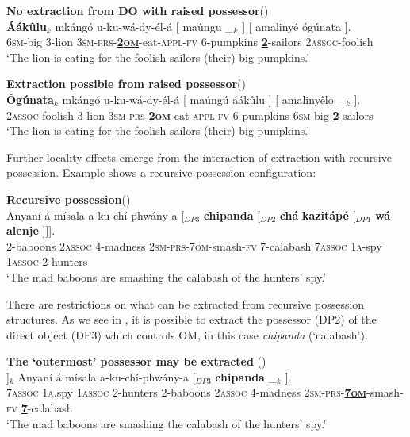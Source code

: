 \documentclass[output=paper,colorlinks,citecolor=brown]{langscibook}
\begin{document}
\ea%
    \label{ex:branan:12}
    \textbf{No extraction from DO with raised possessor}\hfill{(\citealt[55, ex. 22e]{Mchombo2004})}\\
    \gll    *\textbf{\'{A}ákûlu}$_{k}$ mkángó u-ku-wá-dy-él-á [ maûngu \_$_{k}$ ] [ amalinyé ógúnata ]. \\
            \hphantom{*}6\textsc{sm}-big 3-lion 3\textsc{sm-prs}-\textbf{\underline{2\textsc{om}}}-eat-\textsc{appl-fv} {} 6-pumpkins {} {} {} \textbf{\underline{2}}-sailors 2\textsc{assoc}-foolish {} \\
    \glt    `The lion is eating for the foolish sailors (their) big pumpkins.'
\z

\ea%
    \label{ex:branan:13}
    \textbf{Extraction possible from raised possessor}\hfill{(\citealt[56, ex. 22g]{Mchombo2004})}\\
    \gll    \textbf{\'{O}gúnata}$_{k}$ mkángó u-ku-wá-dy-él-á [ maúngú áákûlu ] [ amalinyêlo \_$_{k}$ ]. \\
            2\textsc{assoc}-foolish 3-lion 3\textsc{sm-prs}-\textbf{\underline{2\textsc{om}}}-eat-\textsc{appl-fv} {} 6-pumpkins 6\textsc{sm}-big  {} {} \textbf{\underline{2}}-sailors  \\
\glt        `The lion is eating for the foolish sailors (their) big pumpkins.'
\z

Further locality effects emerge from the interaction of extraction with recursive possession. Example  shows a recursive possession configuration:

\ea%
    \label{ex:branan:14}
    \textbf{Recursive possession}\hfill{(\citealt[60, ex. 29]{Mchombo2004})}\\
    \gll    Anyaní á mísala a-ku-chí-phwány-a [$_{DP3}$ \textbf{chipanda}  [$_{DP2}$ \textbf{chá}  \textbf{kazitápé} [$_{DP1}$ \textbf{wá} \textbf{alenje} ]]]. \\
            2-baboons 2\textsc{assoc} 4-madness 2\textsc{sm-prs}-7\textsc{om}-smash-\textsc{fv} {} 7-calabash {} 7\textsc{assoc} 1\textsc{a}-spy {} 1\textsc{assoc} 2-hunters  \\
    \glt    `The mad baboons are smashing the calabash of the hunters’ spy.'
\z

There are restrictions on what can be extracted from recursive possession structures. As we see in , it is possible to extract the possessor (DP2) of the direct object (DP3) which controls OM, in this case \emph{chipanda} (`calabash').

\ea%
    \label{ex:branan:15}
    \textbf{The `outermost' possessor may be extracted} \hfill{(\citealt[60, ex. 30a]{Mchombo2004})}\\
    \gll    [$_{DP2}$ \textbf{Chá}  \textbf{kazitápé} [$_{DP1}$ \textbf{wá} \textbf{alenje} ]]$_{k}$ Anyaní á mísala a-ku-chí-phwány-a [$_{DP3}$ \textbf{chipanda}   \_$_{k}$ ].  \\
            {} 7\textsc{assoc} 1\textsc{a}.spy {} 1\textsc{assoc} 2-hunters {}  2-baboons 2\textsc{assoc} 4-madness 2\textsc{sm-prs}-\textbf{\underline{7\textsc{om}}}-smash-\textsc{fv} {} \textbf{\underline{7}}-calabash   \\
    \glt    `The mad baboons are smashing the calabash of the hunters’ spy.'
\z
\end{document}

